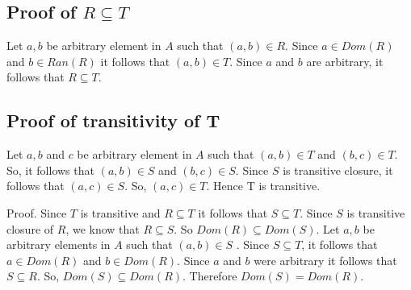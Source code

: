 \documentclass{article}
\begin{document}
\subsection{Proof of $R \subseteq T$}
Let $a,b$ be arbitrary element in $A$ such that $(a,b) \in R$. Since
$a \in Dom(R)$ and $b \in Ran(R)$ it follows that $(a,b) \in T$. Since
$a$ and $b$ are arbitrary, it follows that $R \subseteq T$.

\subsection{Proof of transitivity of T}
Let $a,b$ and $c$ be arbitrary element in $A$ such that $(a,b) \in T$
and $(b,c) \in T$. So, it follows that $(a,b) \in S$ and $(b,c) \in
S$. Since $S$ is transitive closure, it follows that $(a,c) \in S$.
So, $(a,c) \in T$. Hence T is transitive.

Proof. Since $T$ is transitive and $R \subseteq T$ it follows that $S
\subseteq T$. Since $S$ is transitive closure of $R$, we know that $R
\subseteq S$. So $Dom(R) \subseteq Dom(S)$.
Let $a,b$ be arbitrary elements in $A$ such that $(a,b) \in S$ . Since
$S \subseteq T$, it follows that $a \in Dom(R)$ and $b \in Dom(R)$.
Since $a$ and $b$ were arbitrary it follows that $S \subseteq R$. So,
$Dom(S) \subseteq Dom(R)$. Therefore $Dom(S) = Dom(R)$.
\end{document}
